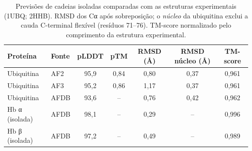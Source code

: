 \begin{table}[H]\centering\small
\caption{Previsões de cadeias isoladas comparadas com as estruturas experimentais (1UBQ; 2HHB). RMSD dos Cα após sobreposição; o \emph{núcleo} da ubiquitina exclui a cauda C-terminal flexível (resíduos 71--76). TM-score normalizado pelo comprimento da estrutura experimental.}\label{tab:monomeros}
\begin{tabular}{llccccc}\toprule
Proteína & Fonte & pLDDT & pTM & RMSD (Å) & RMSD núcleo (Å) & TM-score \\\midrule
Ubiquitina & AF2 & 95,9 & 0,84 & 0,80 & 0,37 & 0,961 \\
Ubiquitina & AF3 & 95,2 & 0,86 & 1,17 & 0,37 & 0,961 \\
Ubiquitina & AFDB & 93,6 & -- & 0,76 & 0,42 & 0,962 \\
\midrule
Hb α (isolada) & AFDB & 98,1 & -- & 0,29 & -- & 0,996 \\
Hb β (isolada) & AFDB & 97,2 & -- & 0,49 & -- & 0,989 \\
\bottomrule\end{tabular}\end{table}
